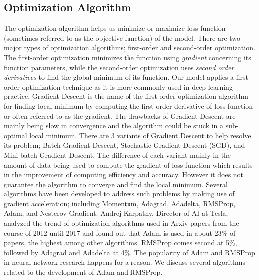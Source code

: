 \subsection{Optimization Algorithm}
The optimization algorithm helps us minimize or maximize loss function (sometimes referred to as the objective function) of the model. There are two major types of optimization algorithms; first-order and second-order optimization. The first-order optimization minimizes the function using \emph{gradient} concerning its function parameters, while the second-order optimization uses \emph{second order derivatives} to find the global minimum of its function. Our model applies a first-order optimization technique as it is more commonly used in deep learning practice. Gradient Descent is the name of the first-order optimization algorithm for finding local minimum by computing the first order derivative of loss function or often referred to as the gradient. The drawbacks of Gradient Descent are mainly being slow in convergence and the algorithm could be stuck in a sub-optimal local minimum. There are 3 variants of Gradient Descent to help resolve its problem; Batch Gradient Descent, Stochastic Gradient Descent (SGD), and Mini-batch Gradient Descent. The difference of each variant mainly in the amount of data being used to compute the gradient of loss function which results in the improvement of computing efficiency and accuracy. However it does not guarantee the algorithm to converge and find the local minimum. Several algorithms have been developed to address such problems by making use of gradient acceleration; including Momentum, Adagrad, Adadelta, RMSProp, Adam, and Nesterov Gradient. Andrej Karpathy, Director of AI at Tesla, analyzed the trend of optimization algorithms used in Arxiv papers from the course of 2012 until 2017 and found out that Adam is used in about 23\% of papers, the highest among other algorithms. RMSProp comes second at 5\%, followed by Adagrad and Adadelta at 4\%. The popularity of Adam and RMSProp in neural network research happens for a reason. We discuss several algorithms related to the development of Adam and RMSProp.

